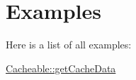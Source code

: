 \section{Examples}
Here is a list of all examples\-:\begin{DoxyCompactItemize}
\item 
\hyperlink{_cacheable_1_1get_cache_data-example}{Cacheable\-::get\-Cache\-Data}
\end{DoxyCompactItemize}
